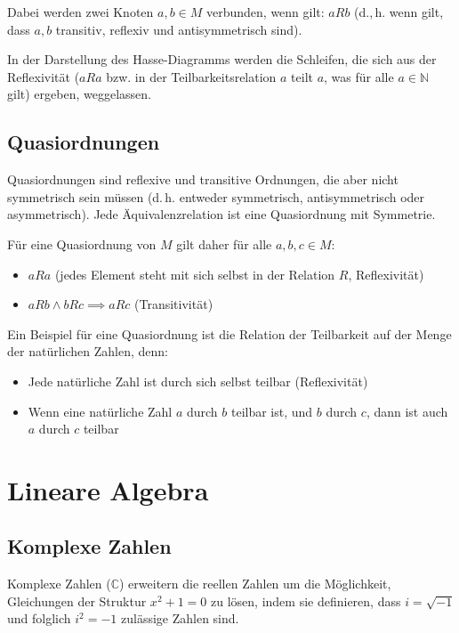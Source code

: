 \documentclass{scrartcl}
\begin{document}
Dabei werden zwei Knoten $a, b \in M$ verbunden, wenn gilt: $aRb$ (d.,\,h. wenn
gilt, dass $a, b$ transitiv, reflexiv und antisymmetrisch sind). 

In der Darstellung
des Hasse-Diagramms werden die Schleifen, die sich aus der Reflexivität ($aRa$ bzw.
in der Teilbarkeitsrelation $a$ teilt $a$, was für alle $a \in \mathbb{N}$ gilt) 
ergeben, weggelassen.

\subsection{Quasiordnungen}

Quasiordnungen sind reflexive und transitive Ordnungen, die aber nicht symmetrisch 
sein müssen (d.\,h. entweder symmetrisch, antisymmetrisch oder asymmetrisch). Jede
Äquivalenzrelation ist eine Quasiordnung mit Symmetrie.

Für eine Quasiordnung von $M$ gilt daher für alle $a, b, c \in M$:

\begin{itemize}
	\item $aRa$ (jedes Element steht mit sich selbst in der Relation 
		$R$, Reflexivität)
	\item $aRb \wedge bRc \implies aRc$ (Transitivität)
\end{itemize}

Ein Beispiel für eine Quasiordnung ist die Relation der Teilbarkeit auf
der Menge der natürlichen Zahlen, denn:

\begin{itemize}
	\item Jede natürliche Zahl ist durch sich selbst teilbar (Reflexivität)
	\item Wenn eine natürliche Zahl $a$ durch $b$ teilbar ist, und $b$ durch
		$c$, dann ist auch $a$ durch $c$ teilbar
\end{itemize}


\section{Lineare Algebra}

\subsection{Komplexe Zahlen}

Komplexe Zahlen ($\mathbb{C}$) erweitern die reellen Zahlen um die Möglichkeit, Gleichungen
der Struktur $x^2 + 1 = 0$ zu lösen, indem sie definieren, dass $i = \sqrt{-1}$ und folglich
$i^2 = -1$ zulässige Zahlen sind.
\end{document}
